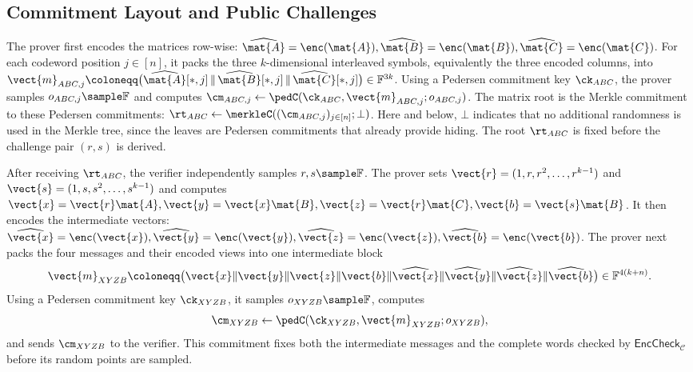 \subsection{Commitment Layout and Public Challenges}
\label{sec:commitment-challenge}

The prover first encodes the matrices row-wise:
{\footnotesize
\(\widehat{\mat{A}}=\enc(\mat{A}),
  \widehat{\mat{B}}=\enc(\mat{B}),
  \widehat{\mat{C}}=\enc(\mat{C})\).
}
For each codeword position \(j\in[n]\), it packs the three \(k\)-dimensional
interleaved symbols, equivalently the three encoded columns, into
{\footnotesize
\(\vect{m}_{ABC,j}
  \coloneqq
  \big(
    \widehat{\mat{A}}[*,j]\,
    \|\,\widehat{\mat{B}}[*,j]\,
    \|\,\widehat{\mat{C}}[*,j]
  \big)
  \in\mathbb{F}^{3k}\).
}
Using a Pedersen commitment key \(\ck_{ABC}\), the prover samples
\(o_{ABC,j}\sample\mathbb{F}\) and computes
{\footnotesize
\(\cm_{ABC,j}
  \gets
  \pedC(\ck_{ABC},\vect{m}_{ABC,j};o_{ABC,j})\).
}
The matrix root is the Merkle commitment to these Pedersen commitments:
{\footnotesize
\(\rt_{ABC}
  \gets
  \merkleC((\cm_{ABC,j})_{j\in[n]};\bot)\).
}
Here and below, \(\bot\) indicates that no additional randomness is used in the
Merkle tree, since the leaves are Pedersen commitments that already provide
hiding. The root \(\rt_{ABC}\) is fixed before the challenge pair \((r,s)\)
is derived.

After receiving \(\rt_{ABC}\), the verifier independently samples
\(r,s\sample\mathbb{F}\).  The prover sets
{\footnotesize
\(\vect{r}=(1,r,r^2,\ldots,r^{k-1})\) and
\(\vect{s}=(1,s,s^2,\ldots,s^{k-1})\)}
and computes
{\footnotesize
\(\vect{x}=\vect{r}\mat{A},
  \vect{y}=\vect{x}\mat{B},
  \vect{z}=\vect{r}\mat{C},
  \vect{b}=\vect{s}\mat{B}\).
}
It then encodes the intermediate vectors:
{\footnotesize
\(\widehat{\vect{x}}=\enc(\vect{x}),
  \widehat{\vect{y}}=\enc(\vect{y}),
  \widehat{\vect{z}}=\enc(\vect{z}),
  \widehat{\vect{b}}=\enc(\vect{b})\).
}
The prover next packs the four messages and their encoded views into one
intermediate block
\[
\vect{m}_{XYZB}
  \coloneqq
  \big(
    \vect{x}\|\vect{y}\|\vect{z}\|\vect{b}\|
    \widehat{\vect{x}}\|\widehat{\vect{y}}\|
    \widehat{\vect{z}}\|\widehat{\vect{b}}
  \big)
  \in\mathbb{F}^{4(k+n)}.
\]
Using a Pedersen commitment key \(\ck_{XYZB}\), it samples
\(o_{XYZB}\sample\mathbb{F}\), computes
\[
  \cm_{XYZB}
  \gets
  \pedC(\ck_{XYZB},\vect{m}_{XYZB};o_{XYZB}),
\]
and sends \(\cm_{XYZB}\) to the verifier.  This commitment fixes both the
intermediate messages and the complete words checked by
\(\mathsf{EncCheck}_{\mathcal C}\) before its random points are sampled.

